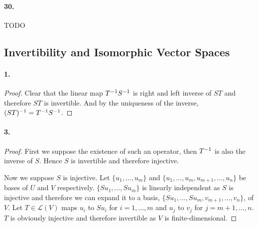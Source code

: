   \paragraph{30.} TODO


\setcounter{subsection}{3}
\subsection{Invertibility and Isomorphic Vector Spaces}

  \paragraph{1.}
  \begin{proof}
    Clear that the linear map $T^{-1} S^{-1}$ is right and left inverse of $ST$
    and therefore $ST$ is invertible. And by the uniqueness of the inverse, 
    $(ST)^{-1} = T^{-1} S^{-1}$.
  \end{proof}

  \paragraph{3.}
  \begin{proof}
    First we suppose the existence of such an operator, then $T^{-1}$ is also the
    inverse of $S$. Hence $S$ is invertible and therefore injective. \par
    Now we suppose $S$ is injective. Let $\{u_1,\dots,u_m\}$ and $\{u_1,\dots, 
    u_m, u_{m+1},\dots,u_n\}$ be bases of $U$ and $V$ respectively. $\{Su_1,
    \dots, Su_m\}$ is linearly independent as $S$ is injective and therefore we
    can expand it to a basis, $\{Su_1,\dots,Su_m,v_{m+1},\dots,v_n\}$, of $V$.
    Let $T\in\mathcal{L}(V)$ maps $u_i$ to $Su_i$ for $i=1,\dots,m$ and $u_j$ to
    $v_j$ for $j=m+1,\dots,n$. $T$ is obviously injective and therefore 
    invertible as $V$ is finite-dimensional. 
  \end{proof}

